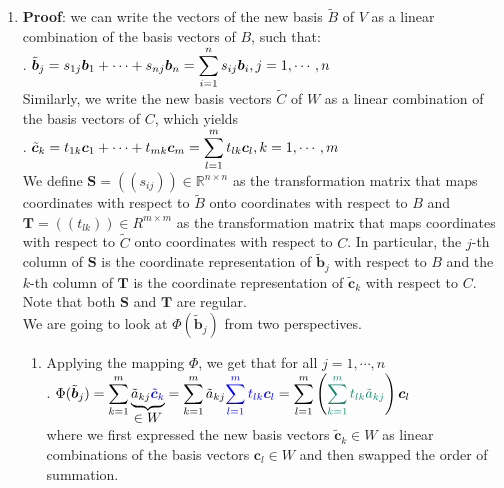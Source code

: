 \begin{enumerate}
    \item \textbf{Proof}: we can write the vectors of the new basis $\tilde{B}$ of $V$ as a linear combination of the basis vectors of $B$, such that:
    \hfill \cite{mfml/book/mml/Deisenroth-Faisal-Ong}
    \\
    .\hfill
    $
        \tilde{\bm{b}}_j 
        = s_{1j} \bm{b}_1 + \cdots + s_{nj} \bm{b}_n 
        = \displaystyle\sum^n _{i=1} s_{ij} \bm{b}_i 
        , j = 1, \cdots , n
    $
    \hfill \cite{mfml/book/mml/Deisenroth-Faisal-Ong}
    \\
    Similarly, we write the new basis vectors $\tilde{C}$ of $W$ as a linear combination of the basis vectors of $C$, which yields
    \hfill \cite{mfml/book/mml/Deisenroth-Faisal-Ong}
    \\
    .\hfill
    $
        \tilde{\bm{c}}_k 
        = t_{1k} \bm{c}_1 + \cdots + t_{mk} \bm{c}_m 
        = \displaystyle\sum^m _{l=1} t_{lk} \bm{c}_l 
        , k = 1, \cdots , m
    $
    \hfill \cite{mfml/book/mml/Deisenroth-Faisal-Ong}
    \\
    We define $\bm{S} = ((s_{ij} )) \in \mathbb{R}^{n\times n}$ as the transformation matrix that maps coordinates with respect to $\tilde{B}$ onto coordinates with respect to $B$ and $\bm{T} = ((t_{lk})) \in R^{m\times m}$ as the transformation matrix that maps coordinates with respect to $\tilde{C}$ onto coordinates with respect to $C$. 
    In particular, the $j$-th column of $\bm{S}$ is the coordinate representation of $\tilde{\bm{b}}_j$ with respect to $B$ and the $k$-th column of $\bm{T}$ is the coordinate representation of $\tilde{\bm{c}}_k$ with respect to $C$. 
    Note that both $\bm{S}$ and $\bm{T}$ are regular.
    \hfill \cite{mfml/book/mml/Deisenroth-Faisal-Ong}
    \\
    We are going to look at $\Phi(\tilde{\bm{b}}_j )$ from two perspectives.
    \hfill \cite{mfml/book/mml/Deisenroth-Faisal-Ong}
    \begin{enumerate}
        \item Applying the mapping $\Phi$, we get that for all $j = 1, \cdots , n$
        \hfill \cite{mfml/book/mml/Deisenroth-Faisal-Ong}
        \\
        .\hfill
        $
            \Phi(\tilde{\bm{b}}_j )
            = \dsum^m_{k=1} \underset{\displaystyle \in W}{
                \underbrace{\tilde{a}_{kj} \textcolor{blue}{\tilde{\bm{c}}_k}}
            }
            = \dsum^m_{k=1} \tilde{a}_{kj} \textcolor{blue}{
                \dsum^m_{l=1} t_{lk} \bm{c}_l
            }
            = \dsum^m_{l=1} \dParenBrac{
                \textcolor{PineGreen}{\dsum^m_{k=1} t_{lk} \tilde{a}_{kj}} 
            }  \bm{c}_l
        $
        \hfill \cite{mfml/book/mml/Deisenroth-Faisal-Ong}
        \\
        where we first expressed the new basis vectors $\tilde{\bm{c}}_k \in W$ as linear combinations of the basis vectors $\bm{c}_l \in W$ and then swapped the order of summation.
        \hfill \cite{mfml/book/mml/Deisenroth-Faisal-Ong}



\end{enumerate}
\end{enumerate}
